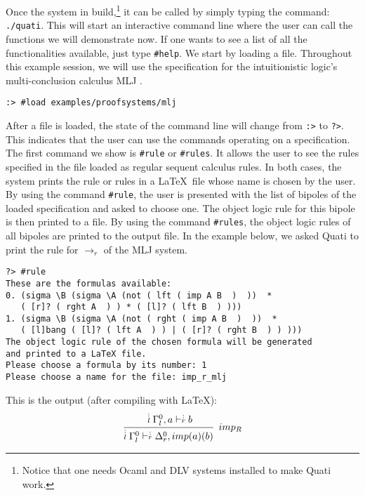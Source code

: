\documentclass{llncs}
\newcommand{\ndots}[1]{\stackrel{\vcenter{\hbox{$\scriptstyle :$}\vskip-.35ex}}
   {\hbox {$ \scriptstyle {#1}$}}}
\begin{document}
Once the system in build,\footnote{Notice that one needs Ocaml and DLV systems installed to make
Quati work.} it can be called by simply typing the command:
\texttt{./quati}. This will start an interactive command line where the user can
call the functions we will demonstrate now. If one wants to see a list of all
the functionalities available, just type \texttt{\#help}. We start by loading a
file. Throughout this example session, we will use the specification for the
intuitionistic logic's multi-conclusion calculus MLJ \cite{maehara54nmj}.
%
\vspace{-1mm}

{\small
\begin{verbatim}
:> #load examples/proofsystems/mlj
\end{verbatim}
}

After a file is loaded, the state of the command line will change from
\texttt{:>} to \texttt{?>}. This indicates that the user can use the commands
operating on a specification. The first command we show is \texttt{\#rule} or
\texttt{\#rules}. It allows the user to see the rules specified in the file
loaded as regular sequent calculus rules. In both cases, the system prints the
rule or rules in a \LaTeX\ file whose name is chosen by the user. By using the
command \texttt{\#rule}, the user is presented with the list of bipoles of the
loaded specification and asked to choose one. The object logic rule for this
bipole is then printed to a file. By using the command \texttt{\#rules}, the
object logic rules of all bipoles are printed to the output file. In the example
below, we asked Quati to print the rule for $\rightarrow_r$ of the MLJ system.
\vspace{-1mm}

{\small
\begin{verbatim}
?> #rule
These are the formulas available: 
0. (sigma \B (sigma \A (not ( lft ( imp A B  )  ))  * 
   ( [r]? ( rght A  ) ) * ( [l]? ( lft B  ) )))
1. (sigma \B (sigma \A (not ( rght ( imp A B  )  ))  * 
   ( [l]bang ( [l]? ( lft A  ) ) | ( [r]? ( rght B  ) ) )))
The object logic rule of the chosen formula will be generated 
and printed to a LaTeX file.
Please choose a formula by its number: 1
Please choose a name for the file: imp_r_mlj
\end{verbatim}
}

This is the output (after compiling with \LaTeX):
%
{\small
\[
\cfrac{ \ndots{l} \Gamma_{l}^{0}, a \vdash  \ndots{r} b}
{ \ndots{l} \Gamma_{l}^{0} \vdash  \ndots{r} \Delta_{r}^{0}, imp (a) (b) } \;\; imp_{R}
\]
}
\end{document}

